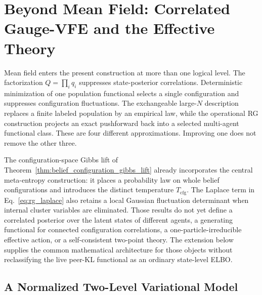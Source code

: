 \documentclass[11pt]{article}
\begin{document}
\section{Beyond Mean Field: Correlated Gauge-VFE and the Effective Theory}
\label{sec:beyond_mean_field_gauge_vfe}

Mean field enters the present construction at more than one logical level. The factorization $Q=\prod_i q_i$ suppresses state-posterior correlations. Deterministic minimization of one population functional selects a single configuration and suppresses configuration fluctuations. The exchangeable large-$N$ description replaces a finite labeled population by an empirical law, while the operational RG construction projects an exact pushforward back into a selected multi-agent functional class. These are four different approximations. Improving one does not remove the other three.

The configuration-space Gibbs lift of Theorem~\ref{thm:belief_configuration_gibbs_lift} already incorporates the central meta-entropy construction: it places a probability law on whole belief configurations and introduces the distinct temperature $T_{\mathrm{cfg}}$. The Laplace term in Eq.~\eqref{eq:rg_laplace} also retains a local Gaussian fluctuation determinant when internal cluster variables are eliminated. Those results do not yet define a correlated posterior over the latent states of different agents, a generating functional for connected configuration correlations, a one-particle-irreducible effective action, or a self-consistent two-point theory. The extension below supplies the common mathematical architecture for those objects without reclassifying the live peer-KL functional as an ordinary state-level ELBO.

\subsection{A Normalized Two-Level Variational Model}
\end{document}
